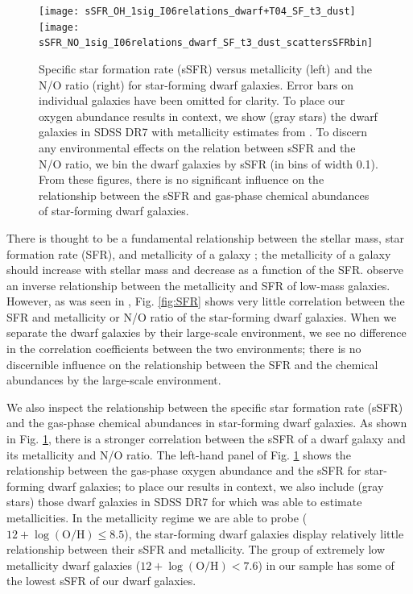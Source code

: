 \begin{figure}
    \centering
    \texttt{[image: sSFR\_OH\_1sig\_I06relations\_dwarf+T04\_SF\_t3\_dust]}
    \texttt{[image: sSFR\_NO\_1sig\_I06relations\_dwarf\_SF\_t3\_dust\_scattersSFRbin]}
    \caption{Specific star formation rate (sSFR) versus metallicity (left) and 
    the N/O ratio (right) for star-forming dwarf galaxies.  Error bars on 
    individual galaxies have been omitted for clarity.  To place our oxygen 
    abundance results in context, we show (gray stars) the dwarf galaxies in 
    SDSS DR7 with metallicity estimates from \cite{Tremonti04}.  To discern any 
    environmental effects on the relation between sSFR and the N/O ratio, we bin 
    the dwarf galaxies by sSFR (in bins of width 0.1).  From these figures, 
    there is no significant influence on the relationship between the sSFR and 
    gas-phase chemical abundances of star-forming dwarf galaxies.}
    \label{fig:sSFR}
\end{figure}

There is thought to be a fundamental relationship between the stellar mass, star 
formation rate (SFR), and metallicity of a galaxy \citep{Mannucci10,LaraLopez10,
Andrews13}; the metallicity of a galaxy should increase with stellar mass and 
decrease as a function of the SFR.  \cite{Henry13} observe an inverse 
relationship between the metallicity and SFR of low-mass galaxies.  However, as 
was seen in \cite{Douglass17a}, Fig. \ref{fig:SFR} shows very little correlation 
between the SFR and metallicity or N/O ratio of the star-forming dwarf galaxies.  
When we separate the dwarf galaxies by their large-scale environment, we see no 
difference in the correlation coefficients between the two environments; there 
is no discernible influence on the relationship between the SFR and the chemical 
abundances by the large-scale environment.

We also inspect the relationship between the specific star formation rate (sSFR) 
and the gas-phase chemical abundances in star-forming dwarf galaxies.  As shown 
in Fig. \ref{fig:sSFR}, there is a stronger correlation between the sSFR of a 
dwarf galaxy and its metallicity and N/O ratio.  The left-hand panel of Fig. 
\ref{fig:sSFR} shows the relationship between the gas-phase oxygen abundance and 
the sSFR for star-forming dwarf galaxies; to place our results in context, we 
also include (gray stars) those dwarf galaxies in SDSS DR7 for which 
\cite{Tremonti04} was able to estimate metallicities.  In the metallicity regime 
we are able to probe ($12 + \log (\text{O}/\text{H}) \leq 8.5$), the 
star-forming dwarf galaxies display relatively little relationship between their 
sSFR and metallicity.  The group of extremely low metallicity dwarf galaxies 
($12 + \log (\text{O}/\text{H}) < 7.6$) in our sample has some of the lowest 
sSFR of our dwarf galaxies.

